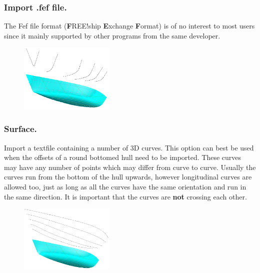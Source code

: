 \documentclass[12pt]{article}
\begin{document}
\subsubsection{Import .fef file.} \label{import-fef}
The Fef file format
(\textbf{F}REE!ship \textbf{E}xchange \textbf{F}ormat) is of no
interest to most users since it mainly supported by other programs
from the same developer.

\begin{figure}
        \centering
        \includegraphics[width=0.4\textwidth,natwidth=537,natheight=391]{filesurface.png}
        \caption{}
        \label{fig:filesurface}
\end{figure}

\subsubsection{Surface.}
Import a textfile containing a number of 3D curves. This option can
best be used when the offsets of a round bottomed hull need to be
imported. These curves may have any number of points which may differ
from curve to curve. Usually the curves run from the bottom of the
hull upwards, however longitudinal curves are allowed too, just as
long as all the curves have the same orientation and run in the same
direction. It is important that the curves are \textbf{not} crossing
each other.

\begin{figure}
        \centering
        \includegraphics[width=0.4\textwidth,natwidth=617,natheight=438]{filesurfacewaterline.png}
        \caption{}
        \label{fig:filesurfacewaterline}
\end{figure}
\end{document}
